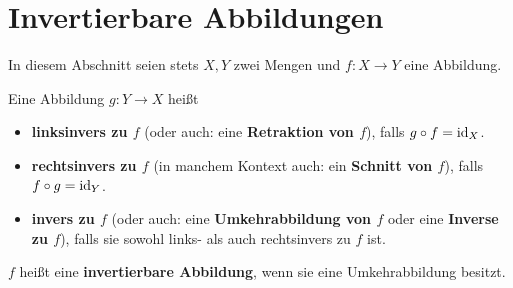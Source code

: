\section{Invertierbare Abbildungen}


In diesem Abschnitt seien stets $X,Y$ zwei Mengen und $f:X\to Y$ eine Abbildung.


\begin{defin}[Umkehrabbildung] \label{def:umkehrabb}    
    Eine Abbildung $g:Y \to X$ heißt 
    \begin{itemize}
        \item \textbf{linksinvers zu $f$} (oder auch: eine \textbf{Retraktion von $f$}), falls $g\circ f=\mathrm{id}_X$.
        \item \textbf{rechtsinvers zu $f$} (in manchem Kontext auch: ein \textbf{Schnitt von $f$}), falls $f\circ g=\mathrm{id}_Y$.
        \item \textbf{invers zu $f$} (oder auch: eine \textbf{Umkehrabbildung von $f$} oder eine \textbf{Inverse zu $f$}), falls sie sowohl links- als auch rechtsinvers zu $f$ ist.
    \end{itemize}
    $f$ heißt eine \textbf{invertierbare Abbildung}, wenn sie eine Umkehrabbildung besitzt.
\end{defin}


